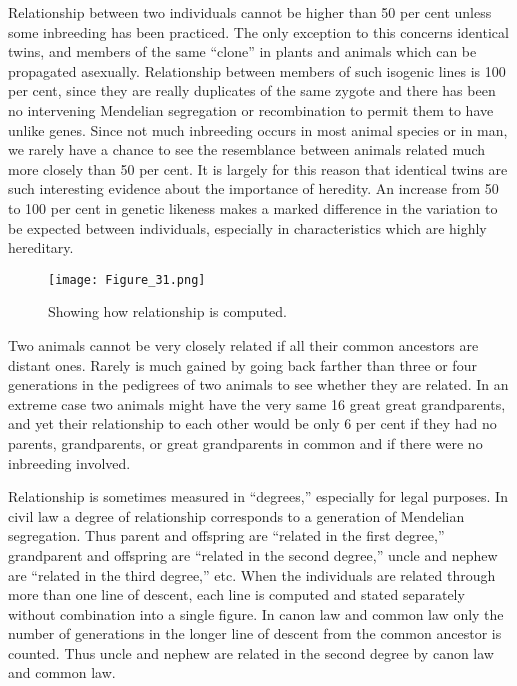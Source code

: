 Relationship between two individuals cannot be higher than 50 per
cent unless some inbreeding has been practiced. The only exception to
this concerns identical twins, and members of the same ``clone'' in
plants and animals which can be propagated asexually. Relationship
between members of such isogenic lines is 100 per cent, since they are
really duplicates of the same zygote and there has been no intervening
Mendelian segregation or recombination to permit them to have unlike
genes. Since not much inbreeding occurs in most animal species or in
man, we rarely have a chance to see the resemblance between animals
related much more closely than 50 per cent. It is largely for this reason
that identical twins are such interesting evidence about the importance
of heredity. An increase from 50 to 100 per cent in genetic likeness
makes a marked difference in the variation to be expected between individuals,
especially in characteristics which are highly hereditary.

\begin{figure}
	\centering
    \texttt{[image: Figure\_31.png]}
    \caption{Showing how relationship is computed.}
    \label{fig:Lush_Figure_31}
\end{figure}

Two animals cannot be very closely related if all their common
ancestors are distant ones. Rarely is much gained by going back farther
than three or four generations in the pedigrees of two animals to see
whether they are related. In an extreme case two animals might have
the very same 16 great great grandparents, and yet their relationship to
each other would be only 6 per cent if they had no parents, grandparents,
or great grandparents in common and if there were no inbreeding
involved.

Relationship is sometimes measured in ``degrees,'' especially for
legal purposes. In civil law a degree of relationship corresponds to a
generation of Mendelian segregation. Thus parent and offspring are
``related in the first degree,'' grandparent and offspring are ``related in
the second degree,'' uncle and nephew are ``related in the third degree,''
etc. When the individuals are related through more than one line of
descent, each line is computed and stated separately without combination
into a single figure. In canon law and common law only the number
of generations in the longer line of descent from the common
ancestor is counted. Thus uncle and nephew are related in the second
degree by canon law and common law.

